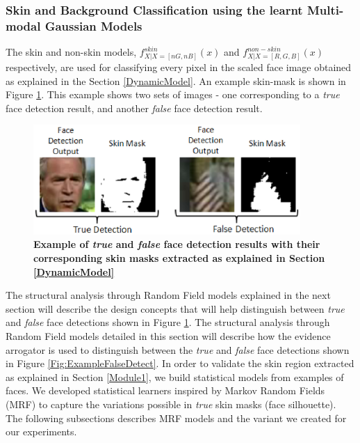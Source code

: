 \documentclass[times, 10pt,twocolumn]{article}
\begin{document}
\subsubsection{Skin and Background Classification using the learnt
Multi-modal Gaussian Models}\label{SkinnBackground} The skin and
non-skin models, $f^{skin}_{X|X=[nG,nB]}(x)$ and
$f^{non-skin}_{X|X=[R,G,B]}(x)$ respectively, are used for
classifying every pixel in the scaled face image obtained as
explained in the Section \ref{DynamicModel}. An example skin-mask is
shown in Figure \ref{Fig:Skinmasks}. This example shows two sets of
images - one corresponding to a {\it true} face detection result,
and another {\it false} face detection result. \vspace{-0.15in}
\begin{figure}[h]
\hspace{-0.4in}
\includegraphics[width=4in]{Figure6.eps}
\caption{{\bf {\selectfont Example of {\em true} and
{\em false} face detection results with their corresponding skin
masks extracted as explained in Section \ref{DynamicModel}}}}
\label{Fig:Skinmasks}
\end{figure}
The structural analysis through Random Field models explained in the
next section will describe the design concepts that will help
distinguish between {\it true} and {\it false} face detections shown
in Figure \ref{Fig:Skinmasks}.
\label{Module2} The structural analysis
through Random Field models detailed in this section will describe
how the evidence arrogator is used to distinguish between the {\it
true} and {\it false} face detections shown in Figure
\ref{Fig:ExampleFalseDetect}. In order to validate the skin region
extracted as explained in Section \ref{Module1}, we build
statistical models from examples of faces. We developed statistical
learners inspired by Markov Random Fields (MRF) to capture the
variations possible in {\it true} skin masks (face silhouette). The
following subsections describes MRF models and the variant we
created for our experiments.
\end{document}
